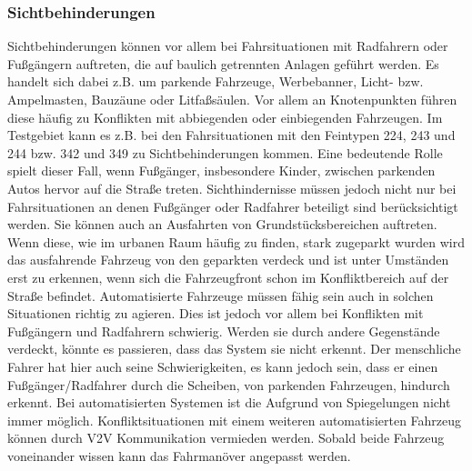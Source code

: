 \subsubsection{Sichtbehinderungen}
Sichtbehinderungen können vor allem bei Fahrsituationen mit Radfahrern oder Fußgängern auftreten, die auf baulich getrennten Anlagen geführt werden. Es handelt sich dabei z.B. um parkende Fahrzeuge, Werbebanner, Licht- bzw. Ampelmasten, Bauzäune oder Litfaßsäulen. Vor allem an Knotenpunkten führen diese häufig zu Konflikten mit abbiegenden oder einbiegenden Fahrzeugen. Im Testgebiet kann es z.B. bei den Fahrsituationen mit den Feintypen 224, 243 und 244 bzw. 342 und 349 zu Sichtbehinderungen kommen. Eine bedeutende Rolle spielt dieser Fall, wenn Fußgänger, insbesondere Kinder, zwischen parkenden Autos hervor auf die Straße treten. Sichthindernisse müssen jedoch nicht nur bei Fahrsituationen an denen Fußgänger oder Radfahrer beteiligt sind berücksichtigt werden. Sie können auch an Ausfahrten von Grundstücksbereichen auftreten. Wenn diese, wie im urbanen Raum häufig zu finden, stark zugeparkt wurden wird das ausfahrende Fahrzeug von den geparkten verdeck und ist unter Umständen erst zu erkennen, wenn sich die Fahrzeugfront schon im Konfliktbereich auf der Straße befindet. Automatisierte Fahrzeuge müssen fähig sein auch in solchen Situationen richtig zu agieren. Dies ist jedoch vor allem bei Konflikten mit Fußgängern und Radfahrern schwierig. Werden sie durch andere Gegenstände verdeckt, könnte es passieren, dass das System sie nicht erkennt. Der menschliche Fahrer hat hier auch seine Schwierigkeiten, es kann jedoch sein, dass er einen Fußgänger/Radfahrer durch die Scheiben, von parkenden Fahrzeugen, hindurch erkennt. Bei automatisierten Systemen ist die Aufgrund von Spiegelungen nicht immer möglich. Konfliktsituationen mit einem weiteren automatisierten Fahrzeug können durch \ac{V2V} Kommunikation vermieden werden. Sobald beide Fahrzeug voneinander wissen kann das Fahrmanöver angepasst werden.

